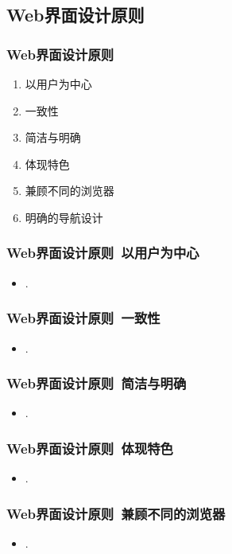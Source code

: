 \documentclass{beamer}
\begin{document}
\subsection{Web界面设计原则}
\begin{frame}
	\frametitle{Web界面设计原则}
	\beamertemplatetransparentcovereddynamicmedium
	\begin{enumerate}[<+->]
		\item 以用户为中心
		\item 一致性
		\item 简洁与明确
		\item 体现特色
		\item 兼顾不同的浏览器
		\item 明确的导航设计
	\end{enumerate}
\end{frame}

\begin{frame}
	\frametitle{Web界面设计原则~{\small 以用户为中心}}
	\beamertemplatetransparentcovereddynamicmedium
	\begin{itemize}[<+->]
		\item .
	\end{itemize}
\end{frame}

\begin{frame}
	\frametitle{Web界面设计原则~{\small 一致性}}
	\beamertemplatetransparentcovereddynamicmedium
	\begin{itemize}[<+->]
		\item .
	\end{itemize}
\end{frame}

\begin{frame}
	\frametitle{Web界面设计原则~{\small 简洁与明确}}
	\beamertemplatetransparentcovereddynamicmedium
	\begin{itemize}[<+->]
		\item .
	\end{itemize}
\end{frame}

\begin{frame}
	\frametitle{Web界面设计原则~{\small 体现特色}}
	\beamertemplatetransparentcovereddynamicmedium
	\begin{itemize}[<+->]
		\item .
	\end{itemize}
\end{frame}

\begin{frame}
	\frametitle{Web界面设计原则~{\small 兼顾不同的浏览器}}
	\beamertemplatetransparentcovereddynamicmedium
	\begin{itemize}[<+->]
		\item .
	\end{itemize}
\end{frame}
\end{document}
